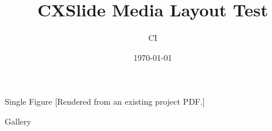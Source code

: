 \documentclass[aspectratio=169, UTF8]{ctexbeamer}
\title{CXSlide Media Layout Test}
\author{CI}
\date{\today}
\begin{document}
\begin{frame}
  \titlepage
\end{frame}

\begin{frame}{Single Figure}
  [Rendered from an existing project PDF.]
\end{frame}

\begin{frame}{Gallery}
\end{frame}
\end{document}
